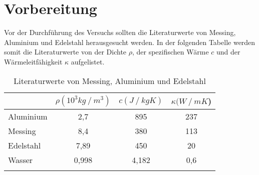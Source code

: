 \section{Vorbereitung}
\label{sec:Vorbereitung}

Vor der Durchführung des Versuchs sollten die Literaturwerte von Messing, Aluminium und Edelstahl herausgesucht werden.
In der folgenden Tabelle werden somit die Literaturwerte von der Dichte $\rho$, der spezifischen Wärme $c$ und der Wärmeleitfähigkeit $\kappa$ aufgelistet.

\begin{table}
    \centering
    \caption{Literaturwerte von Messing, Aluminium und Edelstahl}
    \label{tab:Vorbereitung} 
    \begin{tabular}{
        l
        c
        c
        c
        }
    \toprule
    & {$\rho (10^3\si{kg}\mathbin{/}\si{m^3})$} &{$c (\si{J}\mathbin{/}\si{kg}\si{K})$} & {$\kappa (\si{W}\mathbin{/}\si{mK}$)} \\
    \midrule
        Aluminium & 2,7 & 895 & 237 \\
        Messing & 8,4 & 380 & 113 \\
        Edelstahl & 7,89 & 450 & 20\\
        Wasser & 0,998 & 4,182 & 0,6 \\
    \bottomrule
    \cite[378,381]{PhyPrak} \cite{EdelWäLeit} 
    \end{tabular}
\end{table}